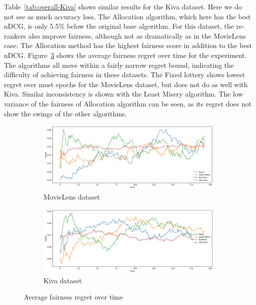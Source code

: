 Table~\ref{tab:overall-Kiva} shows similar results for the Kiva dataset. Here we do not see as much accuracy loss. The Allocation algorithm, which here has the best nDCG, is only 5.5\% below the original base algorithm. For this dataset, the re-rankers also improve fairness, although not as dramatically as in the MovieLens case. The Allocation method has the highest fairness score in addition to the best nDCG.
Figure~\ref{fig:local-regret} shows the average fairness regret over time for the experiment. The algorithms all move within a fairly narrow regret bound, indicating the difficulty of achieving fairness in these datasets. The Fixed lottery shows lowest regret over most epochs for the MovieLens dataset, but does not do as well with Kiva. Similar inconsistency is shown with the Least Misery algorithm. The low variance of the fairness of Allocation algorithm can be seen, as its regret does not show the swings of the other algorithms.

\begin{figure}[tbh]
\setlength\tabcolsep{0pt}
    \begin{subfigure}{1.0\textwidth}
    \centering
    \includegraphics[width=4.5in]{imgs/dynfair/ml_avg_regret_overtime_sep20.png}
    \caption{MovieLens dataset}
    \label{fig:local-regret-ML}
    \end{subfigure}
    \begin{subfigure}{1.0\textwidth}
    \centering
      \includegraphics[width=4.5in]{imgs/dynfair/kiva_avg_regret_overtime_sep20.png}
    \caption{Kiva dataset}
    \label{fig:local-regret-Kiva}
    \end{subfigure}
    \caption{Average fairness regret over time}
    \label{fig:local-regret}
\end{figure}

